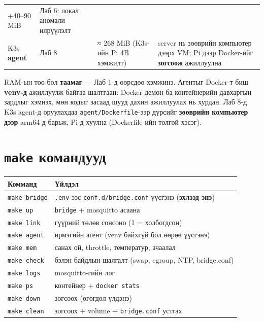 \begin{longtable}[]{@{}llll@{}}
\begin{minipage}[t]{0.22\columnwidth}
+40--90 MiB\strut
\end{minipage} & \begin{minipage}[t]{0.22\columnwidth}\raggedright
Лаб 6: локал аномали илрүүлэлт\strut
\end{minipage}\tabularnewline
\begin{minipage}[t]{0.22\columnwidth}\raggedright
K3s \textbf{agent}\strut
\end{minipage} & \begin{minipage}[t]{0.22\columnwidth}\raggedright
Лаб 8\strut
\end{minipage} & \begin{minipage}[t]{0.22\columnwidth}\raggedright
≈ 268 MiB (K3s-ийн Pi 4B хэмжилт)\strut
\end{minipage} & \begin{minipage}[t]{0.22\columnwidth}\raggedright
server нь зөөврийн компьютер дээрх VM; Pi дээр Docker-ийг \textbf{зогсоож} ажиллуулна\strut
\end{minipage}\tabularnewline
\bottomrule
\end{longtable}\endgroup

RAM-ын тоо бол \textbf{таамаг} --- Лаб 1-д өөрсдөө хэмжинэ. Агентыг Docker-т биш \textbf{venv-д} ажиллуулж байгаа шалтгаан: Docker демон ба контейнерийн давхаргын зардлыг хэмнэх, мөн кодыг засаад шууд дахин ажиллуулах нь хурдан. Лаб 8-д K3s agent-д оруулахдаа \texttt{agent/Dockerfile}-ээр дүрсийг \textbf{зөөврийн компьютер дээр} arm64-д барьж, Pi-д хуулна (Dockerfile-ийн толгой хэсэг).

\hypertarget{make-ux43aux43eux43cux430ux43dux434ux443ux443ux434}{%
\section{\texorpdfstring{\texttt{make} командууд}{make командууд}}\label{make-ux43aux43eux43cux430ux43dux434ux443ux443ux434}}

\begingroup\scriptsize\begin{longtable}[]{@{}ll@{}}
\toprule
Комманд & Үйлдэл\tabularnewline
\midrule
\endhead
\texttt{make\ bridge} & \texttt{.env}-ээс \texttt{conf.\allowbreak{}d/\allowbreak{}bridge.\allowbreak{}conf} үүсгэнэ (\textbf{эхлээд энэ})\tabularnewline
\texttt{make\ up} & \texttt{bridge} + mosquitto асаана\tabularnewline
\texttt{make\ link} & гүүрний төлөв сонсоно (1 = холбогдсон)\tabularnewline
\texttt{make\ agent} & ирмэгийн агент (venv байхгүй бол өөрөө үүсгэнэ)\tabularnewline
\texttt{make\ mem} & санах ой, throttle, температур, ачаалал\tabularnewline
\texttt{make\ check} & бэлэн байдлын шалгалт (swap, cgroup, NTP, bridge.conf)\tabularnewline
\texttt{make\ logs} & mosquitto-гийн лог\tabularnewline
\texttt{make\ ps} & контейнер + \texttt{docker\ stats}\tabularnewline
\texttt{make\ down} & зогсоох (өгөгдөл үлдэнэ)\tabularnewline
\texttt{make\ clean} & зогсоох + volume + \texttt{bridge.conf} устгах\tabularnewline
\bottomrule
\end{longtable}\endgroup

